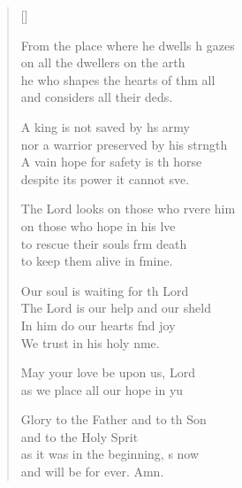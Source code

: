 \begin{verse}[\versewidth]
\begin{patverse}
From the place where he dwells h gazes\Med\\
    on all the dwellers on the arth\\
he who shapes the hearts of thm all\Med\\
    and considers all their deds.

A king is not saved by h\pointup{\i}s army\Med\\
    nor a warrior preserved by his strngth\\
A vain hope for safety is th horse\Med\\
    despite its power it cannot sve.

The Lord looks on those who rvere him\Med\\
    on those who hope in his lve\\
to rescue their souls frm death\Med\\
    to keep them alive in fmine.

Our soul is waiting for th Lord\Med\\
    The Lord is our help and our sh\pointup{\i}eld\\
In him do our hearts f\pointup{\i}nd joy\Med\\
    We trust in his holy nme.

May your love be upon us,  Lord\Med\\
    as we place all our hope in yu

Glory to the Father and to th Son\Med\\
    and to the Holy Sp\pointup{\i}rit\\
as it was in the beginning, \pointup{\i}s now\Med\\
    and will be for ever. Amn.
  \end{patverse}
\end{verse}
